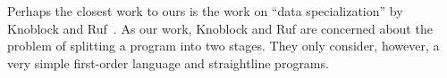 Perhaps the closest work to ours is the work on ``data
specialization'' by Knoblock and Ruf~\cite{knoblock96}.  As our work,
Knoblock and Ruf are concerned about the problem of splitting a
program into two stages.  They only consider, however, a very simple
first-order language and straightline programs.


\begin{comment}


\section{Umut's notes}

...To be added to the paper...
(TODO: make a pass to make consistent the terminology. it is a bit complex.)

Answer the following question for all of the related work:

What happens when we try to write quickselect as a meta program? 

\newcommand{\drun}[2]{\lVert{#2}\rVert_{#1}}

\subsection{Mixed Computation, Partial Evaluation, and Data Specialization.}

\paragraph{Defitions and relationships.}
The following definitions are adapted from the partial evaluation
book, the cited papers, and Malmkjaer thesis.  For simplicity and
uniformity, we assume that data and all programs are drawn from the
same set and that ill-behaved programs and non-terminating programs
all return $bottom$.

Definition[Residual].  

Let $p \in P$ be a program in a language $P$, which takes two inputs
$d_s \in P$ (static data) and $d_d \in P$ (dynamic data).  The program
$r \in P$ is a {\em residual for $p$ with respect to $d_s$} if for all
$d_d$, residual behaves that same as the $p$ for static data $d_s$,
i.e., 
\[
\drun{P}{p} (d_s, d_d) = \drun{P}{r} (d_d).
\]


Definition[Partial Evaluator]
A {\em partial evaluator} or a {\em program specializer} is a program
$e \in P$ (for ``evaluate'') such that for every $p \in P$, and every
$d_s, d_d \in P$, 
\[
\drun{P}{p} (d_s, d_d) = \drun{P}{\drun{P}{e}(p, d_s)} (d_d).
\]


\end{comment}
